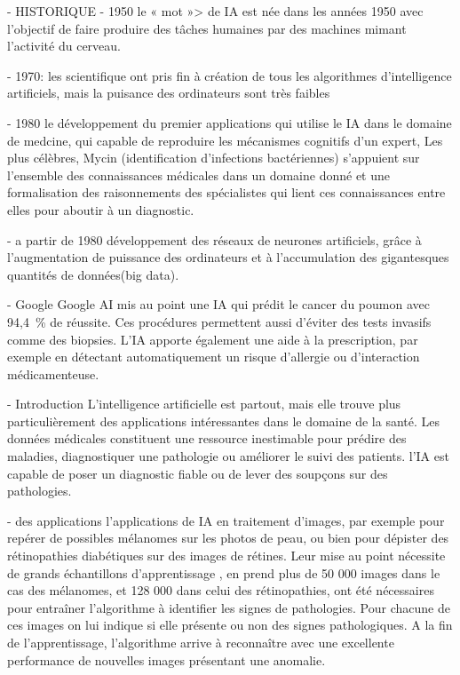 

- HISTORIQUE
- 1950
    le « mot »> de IA est née dans les années 1950 avec l'objectif de faire
    produire des tâches humaines par des machines mimant l'activité du
    cerveau. %

- 1970: 
    les scientifique ont pris fin à création de tous les algorithmes
    d'intelligence artificiels, mais la puisance des ordinateurs sont très
    faibles

- 1980
    le développement du premier applications qui utilise le IA dans le
    domaine de medcine, qui capable de reproduire les mécanismes cognitifs
    d'un expert, Les plus célèbres, Mycin (identification d'infections
    bactériennes) s'appuient sur l'ensemble des connaissances médicales
    dans un domaine donné et une formalisation des raisonnements des
    spécialistes qui lient ces connaissances entre elles pour aboutir à un
    diagnostic.

- a partir de  1980
    développement des réseaux de neurones artificiels, grâce à l'augmentation
    de puissance des ordinateurs et à l'accumulation des gigantesques quantités
    de données(big data).

- Google
    Google AI mis au point une IA qui prédit le cancer du poumon avec
    94,4~\% de réussite. Ces procédures permettent aussi d'éviter des
    tests invasifs comme des biopsies. L'IA apporte également une aide à
    la prescription, par exemple en détectant automatiquement un risque
    d'allergie ou d'interaction médicamenteuse.



- Introduction
    L'intelligence artificielle est partout, mais elle
    trouve plus particulièrement des applications intéressantes dans le
    domaine de la santé. Les données médicales constituent une ressource
    inestimable pour prédire des maladies, diagnostiquer une pathologie ou
    améliorer le suivi des patients.
    l'IA est capable de poser un diagnostic fiable ou de lever des
    soupçons sur des pathologies.



- des applications
    l'applications de IA en traitement d'images,
    par exemple pour repérer de possibles mélanomes
    sur les photos de peau, ou bien pour dépister des rétinopathies
    diabétiques sur des images de rétines. Leur mise au point nécessite de
    grands échantillons d'apprentissage , en prend plus de 50 000 images dans le cas des
    mélanomes, et 128 000 dans celui des rétinopathies, ont été
    nécessaires pour entraîner l'algorithme à identifier les signes de
    pathologies. Pour chacune de ces images on lui indique si elle
    présente ou non des signes pathologiques. A la fin de l'apprentissage,
    l'algorithme arrive à reconnaître avec une excellente performance de
    nouvelles images présentant une anomalie. 

